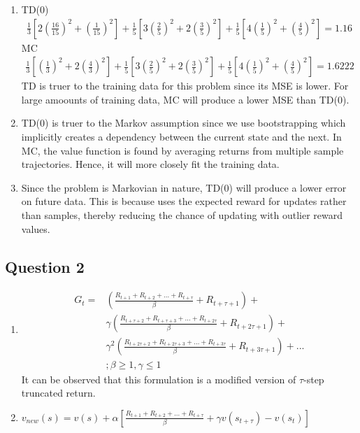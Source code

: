 \documentclass[12pt]{extarticle}
\begin{document}
\begin{enumerate}[label=(\alph*)]
\item TD(0)
	\begin{align*}
	\frac{1}{3}\left[2{\left(\frac{16}{15}\right)}^2 + {\left(\frac{1}{15}\right)}^2\right]
	+ \frac{1}{5}\left[3{\left(\frac{2}{5}\right)}^2 + 2{\left(\frac{3}{5}\right)}^2\right]
	+ \frac{1}{5}\left[4{\left(\frac{1}{5}\right)}^2 + {\left(\frac{4}{5}\right)}^2\right] = 1.16
	\end{align*}
	MC
	\begin{align*}
	\frac{1}{3}\left[{\left(\frac{1}{3}\right)}^2 + 2{\left(\frac{4}{3}\right)}^2\right]
	+ \frac{1}{5}\left[3{\left(\frac{2}{5}\right)}^2 + 2{\left(\frac{3}{5}\right)}^2\right]
	+ \frac{1}{5}\left[4{\left(\frac{1}{5}\right)}^2 + {\left(\frac{4}{5}\right)}^2\right] = 1.6222
	\end{align*}
	TD is truer to the training data for this problem since its MSE is lower. For large amoounts of training data, MC will produce a lower MSE than TD(0).

\item TD(0) is truer to the Markov assumption since we use bootstrapping which implicitly creates a dependency between the current state and the next. In MC, the value function is found by averaging returns from multiple sample trajectories. Hence, it will more closely fit the training data.

\item Since the problem is Markovian in nature, TD(0) will produce a lower error on future data. This is because uses the expected reward for updates rather than samples, thereby reducing the chance of updating with outlier reward values.
\end{enumerate}

\subsection{Question 2}
\begin{enumerate}[label=(\alph*)]
\item 
\begin{align*}
G_t =     & (\frac{R_{t+1} + R_{t+2} + ... + R_{t+\tau}}{\beta} + R_{t+\tau+1}) + \\
	       & \gamma(\frac{R_{t+\tau+2} + R_{t+\tau+3} + ... + R_{t+2\tau}}{\beta} + R_{t+2\tau+1}) + \\
	       & {\gamma}^2(\frac{R_{t+2\tau+2} + R_{t+2\tau+3} + ... + R_{t+3\tau}}{\beta} + R_{t+3\tau+1}) + ...\\
	       &; \beta \geq 1, \gamma \leq 1
\end{align*}
It can be observed that this formulation is a modified version of $\tau$-step truncated return.

\item $v_{new}(s) = v(s) + \alpha\left[\frac{R_{t+1} + R_{t+2} + ... + R_{t+\tau}}{\beta} + \gamma v(s_{t+\tau}) - v(s_t)\right]$  
\end{enumerate}
\end{document}
